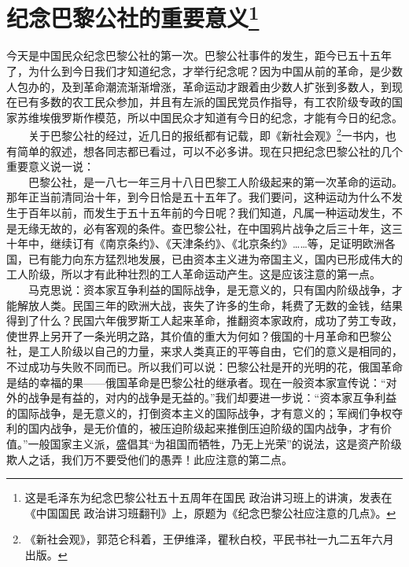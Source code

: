 \documentclass[cn,11pt,chinese]{elegantbook}
\def\myformat#1{\hfil\hfil #1}
\begin{document}
\section*{\myformat{纪念巴黎公社的重要意义\footnote[1]{这是毛泽东为纪念巴黎公社五十五周年在国民 政治讲习班上的讲演，发表在《中国国民 政治讲习班翻刊》上，原题为《纪念巴黎公社应注意的几点》。}}}
今天是中国民众纪念巴黎公社的第一次。巴黎公社事件的发生，距今已五十五年了，为什么到今日我们才知道纪念，才举行纪念呢？因为中国从前的革命，是少数人包办的，及到革命潮流渐渐增涨，革命运动才跟着由少数人扩张到多数人，到现在已有多数的农工民众参加，并且有左派的国民党员作指导，有工农阶级专政的国家苏维埃俄罗斯作模范，所以中国民众才知道有今日的纪念，才能有今日的纪念。\\
　　关于巴黎公社的经过，近几日的报纸都有记载，即《新社会观》\footnote[2]{《新社会观》，郭范仑科着，王伊维泽，瞿秋白校，平民书社一九二五年六月出版。}一书内，也有简单的叙述，想各同志都已看过，可以不必多讲。现在只把纪念巴黎公社的几个重要意义说一说：\\
　　巴黎公社，是一八七一年三月十八日巴黎工人阶级起来的第一次革命的运动。那年正当前清同治十年，到今日恰是五十五年了。我们要问，这种运动为什么不发生于百年以前，而发生于五十五年前的今日呢？我们知道，凡属一种运动发生，不是无缘无故的，必有客观的条件。查巴黎公社，在中国鸦片战争之后三十年，这三十年中，继续订有《南京条约》、《天津条约》、《北京条约》……等，足证明欧洲各国，已有能力向东方猛烈地发展，已由资本主义进为帝国主义，国内已形成伟大的工人阶级，所以才有此种壮烈的工人革命运动产生。这是应该注意的第一点。\\
　　马克思说：资本家互争利益的国际战争，是无意义的，只有国内阶级战争，才能解放人类。民国三年的欧洲大战，丧失了许多的生命，耗费了无数的金钱，结果得到了什么？民国六年俄罗斯工人起来革命，推翻资本家政府，成功了劳工专政，使世界上另开了一条光明之路，其价值的重大为何如？俄国的十月革命和巴黎公社，是工人阶级以自己的力量，来求人类真正的平等自由，它们的意义是相同的，不过成功与失败不同而已。所以我们可以说：巴黎公社是开的光明的花，俄国革命是结的幸福的果——俄国革命是巴黎公社的继承者。现在一般资本家宣传说：“对外的战争是有益的，对内的战争是无益的。”我们却要进一步说：“资本家互争利益的国际战争，是无意义的，打倒资本主义的国际战争，才有意义的；军阀们争权夺利的国内战争，是无价值的，被压迫阶级起来推倒压迫阶级的国内战争，才有价值。”一般国家主义派，盛倡其“为祖国而牺牲，乃无上光荣”的说法，这是资产阶级欺人之话，我们万不要受他们的愚弄！此应注意的第二点。\\
\end{document}
